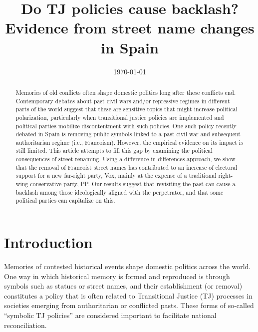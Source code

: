 \documentclass[12pt, titlepage]{article}
\title{\Large Do TJ policies cause backlash?\\Evidence from street name changes in Spain}
\author{}
\date{\today}
\begin{document}
\maketitle

\begin{abstract}
\noindent
Memories of old conflicts often shape domestic politics long after these conflicts end. Contemporary debates about past civil wars and/or repressive regimes in different parts of the world suggest that these are sensitive topics that might increase political polarization, particularly when transitional justice policies are implemented and political parties mobilize discontentment with such policies. One such policy recently debated in Spain is removing public symbols linked to a past civil war and subsequent authoritarian regime (i.e., Francoism). However, the empirical evidence on its impact is still limited. This article attempts to fill this gap by examining the political consequences of street renaming. Using a difference-in-differences approach, we show that the removal of Francoist street names has contributed to an increase of electoral support for a new far-right party, Vox, mainly at the expense of a traditional right-wing conservative party, PP. Our results suggest that revisiting the past can cause a backlash among those ideologically aligned with the perpetrator, and that some political parties can capitalize on this.

\vspace{10pt}
\noindent

\end{abstract}

\newpage
\section*{Introduction}

Memories of contested historical events shape domestic politics across the world. One way in which historical memory is formed and reproduced is through symbols such as statues or street names, and their establishment (or removal) constitutes a policy that is often related to Transitional Justice (TJ) processes in societies emerging from authoritarian or conflicted pasts. These forms of so-called ``symbolic TJ policies'' are considered important to facilitate national reconciliation.

\end{document}

